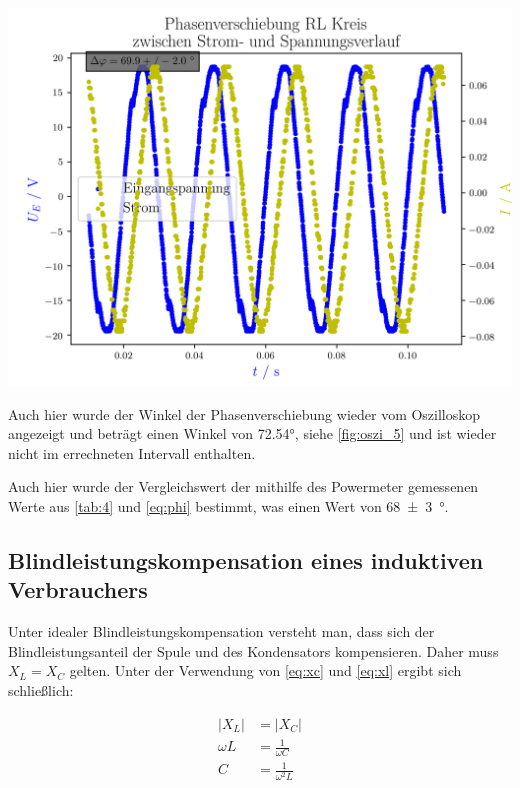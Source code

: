 \documentclass[11pt,ngerman]{scrartcl}
\begin{document}
\begin{center}
	\begin{minipage}[t]{0.8\textwidth}
		\includegraphics[width=\textwidth]{./figures/phaseleistung/Versuch5/phaseshiftrl.png}
		\label{fig:phaseshiftrl}
	\end{minipage}
\end{center}

Auch hier wurde der Winkel der Phasenverschiebung wieder vom Oszilloskop angezeigt und beträgt einen Winkel von 72.54°, siehe \autoref{fig:oszi_5} und ist wieder nicht im errechneten Intervall enthalten.

Auch hier wurde der Vergleichswert der mithilfe des Powermeter gemessenen Werte aus \autoref{tab:4} und \autoref{eq:phi} bestimmt, was einen Wert von \SI{68(3)}{\degree}.


\subsection{Blindleistungskompensation eines induktiven Verbrauchers}

Unter idealer Blindleistungskompensation versteht man, dass sich der Blindleistungsanteil der Spule und des Kondensators kompensieren. Daher muss $X_L=X_C$ gelten. Unter der Verwendung von \autoref{eq:xc} und \autoref{eq:xl} ergibt sich schließlich:

\begin{align*}
	|X_L|    & = |X_C|                 \\
	\omega L & = \frac{1 }{\omega C}   \\
	C        & = \frac{1 }{\omega^2 L}
\end{align*}
\end{document}
